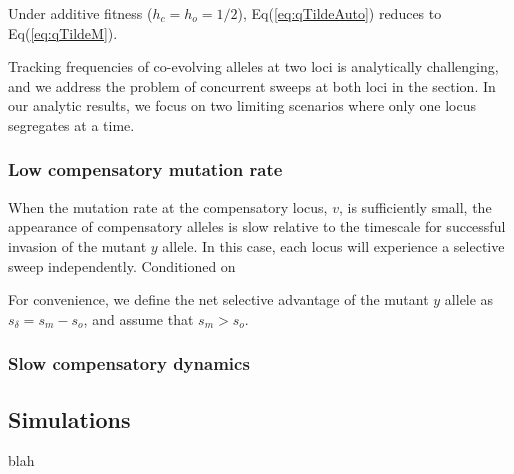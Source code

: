 \documentclass{article}
\begin{document}
\noindent Under additive fitness ($h_c = h_o = 1/2$), Eq(\ref{eq:qTildeAuto}) reduces to Eq(\ref{eq:qTildeM}).
\bigskip

Tracking frequencies of co-evolving alleles at two loci is analytically challenging, and we address the problem of concurrent sweeps at both loci in the  section. In our analytic results, we focus on two limiting scenarios where only one locus segregates at a time.


\subsubsection*{Low compensatory mutation rate} 

When the mutation rate at the compensatory locus, $v$, is sufficiently small, the appearance of compensatory alleles is slow relative to the timescale for successful invasion of the mutant $y$ allele. In this case, each locus will experience a selective sweep independently. Conditioned on 


For convenience, we define the net selective advantage of the mutant $y$ allele as $s_{\delta} = s_m - s_o$, and assume that $s_m > s_o$.

\subsubsection*{Slow compensatory dynamics} 

\subsection{Simulations} \label{subsec:simulations}

blah 

%
\end{document}
